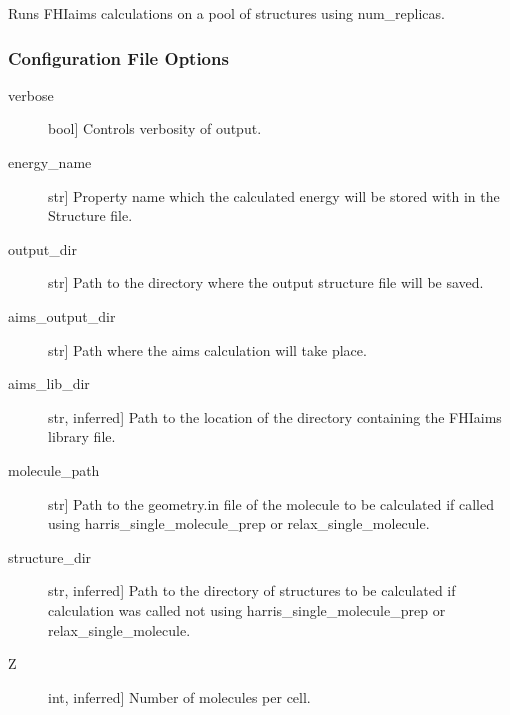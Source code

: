 \documentclass[letterpaper,10pt,english]{sphinxmanual}
\begin{document}
\begin{fulllineitems}
\begin{fulllineitems}
\label{\detokenize{index:Genarris.genarris_master.Genarris.Run_FHI_Aims_Batch}}
Runs FHI\sphinxhyphen{}aims calculations on a pool of structures using num\_replicas.
\subsubsection*{Configuration File Options}
\begin{description}
\item[{verbose}] \leavevmode{[}bool{]}
Controls verbosity of output.

\item[{energy\_name}] \leavevmode{[}str{]}
Property name which the calculated energy will be stored with in the
Structure file.

\item[{output\_dir}] \leavevmode{[}str{]}
Path to the directory where the output structure file will be saved.

\item[{aims\_output\_dir}] \leavevmode{[}str{]}
Path where the aims calculation will take place.

\item[{aims\_lib\_dir}] \leavevmode{[}str, inferred{]}
Path to the location of the directory containing the FHI\sphinxhyphen{}aims library
file.

\item[{molecule\_path}] \leavevmode{[}str{]}
Path to the geometry.in file of the molecule to be calculated if
called using harris\_single\_molecule\_prep or relax\_single\_molecule.

\item[{structure\_dir}] \leavevmode{[}str, inferred{]}
Path to the directory of structures to be calculated if calculation
was called not using harris\_single\_molecule\_prep or
relax\_single\_molecule.

\item[{Z}] \leavevmode{[}int, inferred{]}
Number of molecules per cell.

\end{description}

\end{fulllineitems}


\end{fulllineitems}
\end{document}
